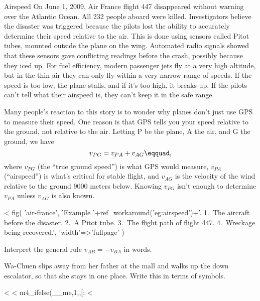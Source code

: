 \begin{eg}{Airspeed}\label{eg:airspeed}
On June 1, 2009, Air France flight 447 disappeared without warning over the Atlantic Ocean.
All 232 people aboard were killed.
Investigators believe the disaster was triggered because the pilots lost the ability to
accurately determine their speed relative to the air. This is done using sensors called Pitot
tubes, mounted outside the plane on the wing. Automated radio signals showed that these sensors
gave conflicting readings before the crash, possibly because they iced up. For fuel efficiency,
modern passenger jets fly at a very high altitude, but in the thin air they
can only fly within a very narrow range of speeds. If the speed is too low, the plane stalls, and
if it's too high, it breaks up. If the pilots can't tell what their airspeed is, they can't
keep it in the safe range.

Many people's reaction to this story is to wonder why planes don't just use GPS to measure their
speed. One reason is that GPS tells you your speed relative to the ground, not relative to the
air. Letting P be the plane, A the air, and G the ground, we have
\begin{equation*}
  v_{PG} = v_{PA}+v_{AG}\eqquad,
\end{equation*}
where $v_{PG}$ (the ``true ground speed'') is what GPS would measure, $v_{PA}$ (``airspeed'')
is what's critical for stable flight, and $v_{AG}$ is the velocity of the wind relative to
the ground 9000 meters below. Knowing $v_{PG}$ isn't enough to determine $v_{PA}$ unless
$v_{AG}$ is also known.
\end{eg}

<%
  fig(   
    'air-france',
    'Example '+ref_workaround('eg:airspeed')+'. 1.~The aircraft before the disaster. 2.~A Pitot tube. 3.~The flight path of flight 447. 4.~Wreckage being recovered.',
    {
      'width'=>'fullpage'
    }
  )

\startdqs

\begin{dq}
Interpret the general rule $v_{AB}=-v_{BA}$ in words.
\end{dq}

\begin{dq}
Wa-Chuen slips away from her father at the mall and walks
up the down escalator, so that she stays in one place. Write
this in terms of symbols.
\end{dq}

<%
<%
m4_ifelse(__me,1,,[:
<%

